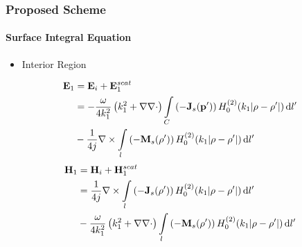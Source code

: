 \documentclass[mathserif,18pt,xcolor=table]{beamer}
\begin{document}
  \begin{frame}
    \frametitle{Proposed Scheme}
    \framesubtitle{Surface Integral Equation}
    \vspace*{-.4cm}
    \begin{itemize}
      \item{Interior Region}
    \end{itemize}
    \begin{equation} \nonumber
      \begin{split}
        \mathbf{E}_1 &= \mathbf{E}_i + \mathbf{E}_1^{scat} \\
        &=  -\frac{\omega}{4 k_1^2} \left( k_1^2 + \nabla \nabla \cdot \right) \int\limits_{C} \left(-\mathbf{J}_s(\mathbf{p}')\right) H_0^{(2)}(k_1 |\mathbf{\rho} - \mathbf{\rho}'|) \mathop{}\!\mathrm{d}{l'} \\
        &- \frac{1}{4 j} \nabla \times \int\limits_{l} \left(-\mathbf{M}_s(\mathbf{\rho}')\right) H_0^{(2)}(k_1 |\mathbf{\rho} - \mathbf{\rho}'|) \mathop{}\!\mathrm{d}{l'}
      \end{split}
      \label{eq:E1sc}
    \end{equation}
    \begin{equation} \nonumber
      \begin{split}
        \mathbf{H}_1 &= \mathbf{H}_i + \mathbf{H}_1^{scat} \\
        &= \frac{1}{4 j} \nabla \times \int\limits_{l} \left(-\mathbf{J}_s(\mathbf{\rho}')\right) H_0^{(2)}(k_1 |\mathbf{\rho} - \mathbf{\rho}'|) \mathop{}\!\mathrm{d}{l'} \\
        &-\frac{\omega}{4 k_1^2} \left( k_1^2 + \nabla \nabla \cdot \right) \int\limits_{l} \left(-\mathbf{M}_s(\mathbf{\rho}')\right) H_0^{(2)}(k_1 |\mathbf{\rho} - \mathbf{\rho}'|) \mathop{}\!\mathrm{d}{l'}
      \end{split}
      \label{eq:H1sc}
    \end{equation}
  \end{frame}
\end{document}
